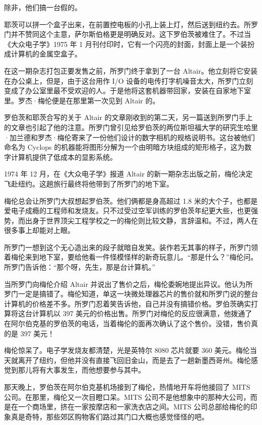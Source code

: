 \documentclass[12pt,UTF8]{ctexbook}
\begin{document}
除非，他们搞一台假的。

耶茨可以拼一个盒子出来，在前置控电板的小孔上装上灯，然后送到纽约去。所罗门并不赞同这个主意，萨尔斯伯格更是明确反对。这下罗伯茨被难住了。不过当《大众电子学》1975 年 1 月刊付印时，它有一个闪亮的封面，封面上是一个装扮成计算机的金属空盒子。

在这一期杂志打包正要发售之前，所罗门终于拿到了一台 Altair。他立刻将它安装在办公桌上，但是，由于这台用作 I/O 设备的电传打字机噪音太大，所罗门立刻变成了办公室里最不受欢迎的人。于是他将这套机器带回家，安装在自家地下室里。罗杰·梅伦便是在那里第一次见到 Altair 的。

罗伯茨和耶茨合写的关于 Altair 的文章刚收到的第二天，另一篇送到所罗门手上的文章也引起了他的注意。所罗门曾引见给罗伯茨的两位斯坦福大学的研究生哈里·加兰德和罗杰·梅伦寄来了一份他们设计的数字相机的规格说明书。这台被他们命名为 Cyclops 的机器能将图形分解为一个由明暗方块组成的矩形格子，这为数字计算机提供了低成本的显影系统。

1974 年 12 月，在《大众电子学》报道 Altair 的新一期杂志出版之前，梅伦决定飞赴纽约。这趟旅行最终将他带到了所罗门的地下室。

梅伦总会让所罗门大叔想起罗伯茨。他们俩都是身高超过 1.8 米的大个子，也都是爱电子成瘾的工程师和发烧友。只不过受过空军训练的罗伯茨年纪更大些，也更强势，而出身于世界顶尖工程学校之一的梅伦则比较文静，言辞温和。不过，两人在很多事上却能对上眼。

所罗门一想到这个无心造出来的段子就暗自发笑。装作若无其事的样子，所罗门领着梅伦来到地下室，要给他看一件怪模怪样的新奇玩意儿。“那是什么？”梅伦问。所罗门告诉他：“那个呀，先生，那是台计算机。”

当所罗门向梅伦介绍 Altair 并说出了售价之后，梅伦委婉地提出异议。他认为所罗门一定是搞错了。梅伦知道，单这一块微处理器芯片的售价就和所罗门说的整台计算机的价格差不多。所罗门忍着笑告诉他，自己并没有搞错价格。罗伯茨确实打算将这台计算机以 397 美元的价格出售。所罗门对梅伦的反应很满意，他拨通了在阿尔伯克基的罗伯茨的电话，当着梅伦的面再次确认了这个售价。没错，售价真的是 397 美元！

梅伦惊呆了。电子学发烧友都清楚，光是英特尔 8080 芯片就要 360 美元。梅伦当天就离开了纽约，但他并没有直接飞回旧金山，而是去了一趟新墨西哥州。梅伦感觉到那儿将有大事发生，而他想要参与其中。

那天晚上，罗伯茨在阿尔伯克基机场接到了梅伦，热情地开车将他接回了 MITS 公司。在那里，梅伦又一次目瞪口呆。MITS 公司不是他想象中的那种大公司，而是在一个商场里，挤在一家按摩店和一家洗衣店之间。MITS 公司总部给梅伦的印象真是奇特，那些郊区购物客们路过其门口大概也感觉怪怪的吧。
\end{document}
